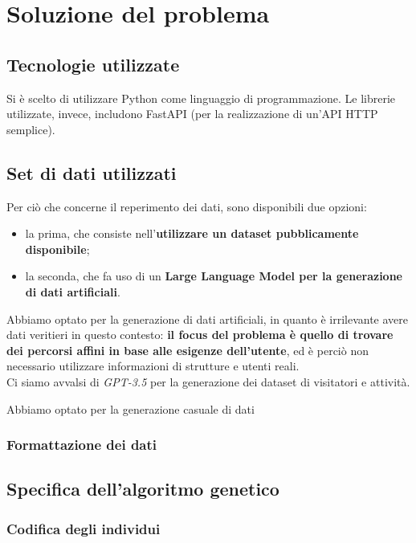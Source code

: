 \documentclass{CSUniSchoolLabReport}
\begin{document}
\section{Soluzione del problema}
\subsection{Tecnologie utilizzate}

Si è scelto di utilizzare Python come linguaggio di programmazione. Le librerie utilizzate, invece, includono FastAPI (per la realizzazione di un'API HTTP semplice).

\subsection{Set di dati utilizzati}

Per ciò che concerne il reperimento dei dati, sono disponibili due opzioni:

\begin{itemize}
    \item la prima, che consiste nell'\textbf{utilizzare un dataset pubblicamente disponibile};
    \item la seconda, che fa uso di un \textbf{Large Language Model per la generazione di dati artificiali}.
\end{itemize}

Abbiamo optato per la generazione di dati artificiali, in quanto è irrilevante avere dati veritieri in questo contesto: \textbf{il focus del problema è quello di trovare dei percorsi affini in base alle esigenze dell'utente}, ed è perciò non necessario utilizzare informazioni di strutture e utenti reali. \\
Ci siamo avvalsi di \textit{GPT-3.5} per la generazione dei dataset di visitatori e attività.

Abbiamo optato per la generazione casuale di dati

\subsubsection{Formattazione dei dati}



\subsection{Specifica dell'algoritmo genetico}

\subsubsection{Codifica degli individui}
\end{document}
